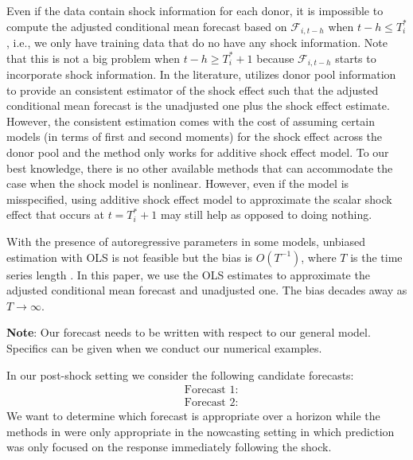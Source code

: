 \documentclass[11pt]{article}
\theoremstyle{definition}
\begin{document}
 Even if the data contain shock information for each donor, it is impossible to compute the adjusted conditional mean forecast based on $\mathcal{F}_{i, t-h}$ when $t -h \leq T_i^*$, i.e., we only have training data that do no have any shock information. Note that this is not a big problem when $t-h \geq T_i^* +1$ because  $\mathcal{F}_{i, t-h}$ starts to incorporate shock information. In the literature, \cite{lin2021minimizing} utilizes donor pool information to provide an consistent estimator of the shock effect such that the adjusted  conditional mean forecast is the unadjusted one plus the shock effect estimate. However, the consistent estimation comes with the cost of assuming certain models (in terms of first and second moments) for the shock effect across the donor pool and the method only works for additive shock effect model.  To our best knowledge, there  is no other available methods that can accommodate the case when the shock model is nonlinear. However, even if the model is misspecified, using additive shock effect model to approximate the scalar shock effect that occurs at $t=T_i^*+1$ may still help as opposed to doing nothing. 
 
 With the presence of autoregressive parameters in some models, unbiased estimation with OLS  is not feasible but the bias is $O(T^{-1})$, where $T$ is the time series length \citep{shaman1988bias}. In this paper, we use the OLS estimates to approximate the adjusted conditional mean forecast and unadjusted one. The bias decades away as $T\to \infty$.

\vspace*{0.5cm}

\noindent\textbf{Note}: Our forecast needs to be written with respect to our general model. Specifics can be given when we conduct our numerical examples.
\vspace*{0.5cm}

In our post-shock setting we consider the following candidate forecasts: 
\begin{align*}
  &\text{Forecast 1}: \\
  &\text{Forecast 2}: 
\end{align*}
We want to determine which forecast is appropriate over a horizon while the methods in \cite{lin2021minimizing} were only appropriate in the nowcasting setting in which prediction was only focused on the response immediately following the shock.





\newpage
\end{document}

